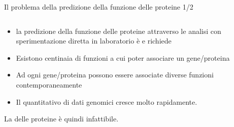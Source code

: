 \documentclass{beamer}
\begin{document}
\begin{tframe}{\small Il problema della predizione della funzione delle proteine 1/2}
  \begin{columns}
    \begin{column}{.75\textwidth}
      \minipage[c][0.4\textheight][s]{\columnwidth}
	   \begin{itemize}	
	  \item la predizione della funzione delle proteine attraverso le analisi con sperimentazione diretta in laboratorio è  e richiede 
	  \onslide<2->
	  \item Esistono centinaia di funzioni a cui poter associare un gene/proteina 
	  \onslide<3->
	  \item Ad ogni gene/proteina possono essere associate diverse funzioni contemporaneamente 
	  \item Il quantitativo di dati genomici cresce molto rapidamente.
      \end{itemize}
      La  delle proteine è quindi infattibile.
      \endminipage      
    \end{column}
    \begin{column}{.25\textwidth}



    \end{column}
  \end{columns}

\end{tframe}
\end{document}
